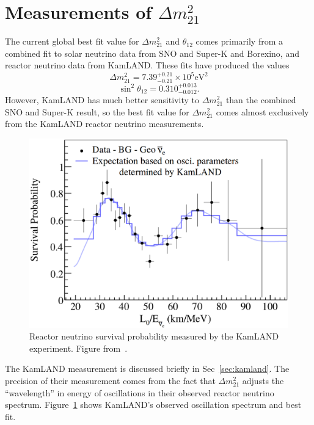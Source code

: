 \section{Measurements of \textbf{$\Delta m^{2}_{21}$}}
\label{sec:dm21_tension}
The current global best fit value for  $\Delta m^{2}_{21}$ and
$\theta_{12}$ comes
primarily from a combined fit to solar neutrino data from SNO
and Super-K and Borexino, and reactor neutrino data from KamLAND\@.
These fits have produced the values
\begin{equation}
    \Delta m^{2}_{21} = 7.39^{+0.21}_{-0.21}\times10^5 \text{eV}^{2}
\end{equation}
\begin{equation}
    \sin^2\theta_{12} = 0.310^{+0.013}_{-0.012}\text{.}
\end{equation}
However, KamLAND has much better sensitivity to $\Delta m^{2}_{21}$
than the combined SNO and Super-K result, so the best fit value for
$\Delta m^{2}_{21}$ comes almost exclusively from the KamLAND
reactor neutrino measurements.
\begin{figure}[htbp]
    \centering
    \includegraphics[width=\textwidth]{kamland_oscillation}
    \caption[KamLAND Oscillation Spectrum]{
    Reactor neutrino survival probability measured
    by the KamLAND experiment. Figure from~\cite{kamland_reactor}.}
    \label{fig:kamland_oscillation}
\end{figure}
The KamLAND measurement is discussed briefly in Sec~\ref{sec:kamland}.
The precision of their measurement comes from the fact that $\Delta m^{2}_{21}$
adjusts the ``wavelength'' in energy of oscillations in their observed
reactor neutrino spectrum.
Figure~\ref{fig:kamland_oscillation} shows KamLAND's observed oscillation
spectrum and best fit.

